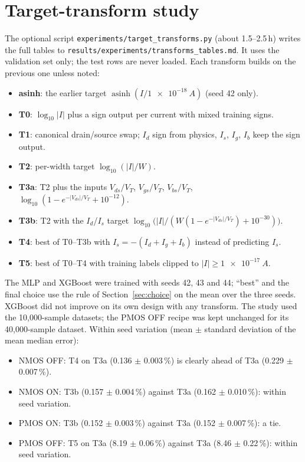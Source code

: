 \documentclass[11pt,a4paper]{article}
\begin{document}
\section{Target-transform study}
\label{app:tt}
The optional script \texttt{experiments/target\_transforms.py} (about 1.5--2.5\,h) writes the full tables
to \texttt{results/experiments/transforms\_tables.md}. It uses the validation set only; the test rows are
never loaded. Each transform builds on the previous one unless noted:
\begin{itemize}[itemsep=1pt]
  \item \textbf{asinh}: the earlier target $\operatorname{asinh}(I/\SI{1e-18}{A})$ (seed 42 only).
  \item \textbf{T0}: $\log_{10}|I|$ plus a sign output per current with mixed training signs.
  \item \textbf{T1}: canonical drain/source swap; $I_d$ sign from physics, $I_s$, $I_g$, $I_b$ keep the sign output.
  \item \textbf{T2}: per-width target $\log_{10}(|I|/W)$.
  \item \textbf{T3a}: T2 plus the inputs $V_{ds}/V_T$, $V_{gs}/V_T$, $V_{bs}/V_T$, $\log_{10}(1-e^{-|V_{ds}|/V_T}+10^{-12})$.
  \item \textbf{T3b}: T2 with the $I_d$/$I_s$ target $\log_{10}\bigl(|I|/(W(1-e^{-|V_{ds}|/V_T})+10^{-30})\bigr)$.
  \item \textbf{T4}: best of T0--T3b with $I_s = -(I_d+I_g+I_b)$ instead of predicting $I_s$.
  \item \textbf{T5}: best of T0--T4 with training labels clipped to $|I| \ge \SI{1e-17}{A}$.
\end{itemize}
The MLP and XGBoost were trained with seeds 42, 43 and 44; ``best'' and the final choice use the rule of
Section~\ref{sec:choice} on the mean over the three seeds. XGBoost did not improve on its own design with
any transform. The study used the 10,000-sample datasets; the PMOS OFF recipe was kept unchanged for its
40,000-sample dataset. Within seed variation (mean $\pm$ standard deviation of the mean median error):
\begin{itemize}[itemsep=1pt]
  \item NMOS OFF: T4 on T3a (0.136 $\pm$ 0.003\,\%) is clearly ahead of T3a (0.229 $\pm$ 0.007\,\%).
  \item NMOS ON: T3b (0.157 $\pm$ 0.004\,\%) against T3a (0.162 $\pm$ 0.010\,\%): within seed variation.
  \item PMOS ON: T3b (0.152 $\pm$ 0.003\,\%) against T3a (0.152 $\pm$ 0.007\,\%): a tie.
  \item PMOS OFF: T5 on T3a (8.19 $\pm$ 0.06\,\%) against T3a (8.46 $\pm$ 0.22\,\%): within seed variation.
\end{itemize}
\end{document}
